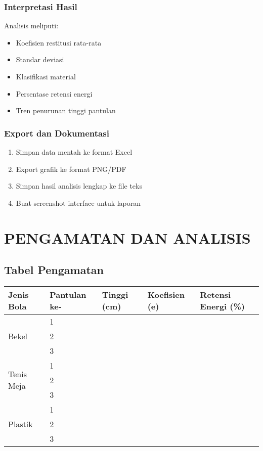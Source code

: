 \documentclass[12pt,a4paper]{article}
\begin{document}
\subsubsection{Interpretasi Hasil}
Analisis meliputi:
\begin{itemize}
    \item Koefisien restitusi rata-rata
    \item Standar deviasi
    \item Klasifikasi material
    \item Persentase retensi energi
    \item Tren penurunan tinggi pantulan
\end{itemize}

\subsubsection{Export dan Dokumentasi}
\begin{enumerate}
    \item Simpan data mentah ke format Excel
    \item Export grafik ke format PNG/PDF
    \item Simpan hasil analisis lengkap ke file teks
    \item Buat screenshot interface untuk laporan
\end{enumerate}

\section{PENGAMATAN DAN ANALISIS}

\subsection{Tabel Pengamatan}
\begin{longtable}{|p{2cm}|p{2cm}|p{2cm}|p{2cm}|p{3cm}|}
\hline
\textbf{Jenis Bola} & \textbf{Pantulan ke-} & \textbf{Tinggi (cm)} & \textbf{Koefisien (e)} & \textbf{Retensi Energi (\%)} \\
\hline
\multirow{3}{*}{Bekel} & 1 & & & \\
\cline{2-5}
& 2 & & & \\
\cline{2-5}
& 3 & & & \\
\hline
\multirow{3}{*}{Tenis Meja} & 1 & & & \\
\cline{2-5}
& 2 & & & \\
\cline{2-5}
& 3 & & & \\
\hline
\multirow{3}{*}{Plastik} & 1 & & & \\
\cline{2-5}
& 2 & & & \\
\cline{2-5}
& 3 & & & \\
\hline
\end{longtable}
\end{document}
